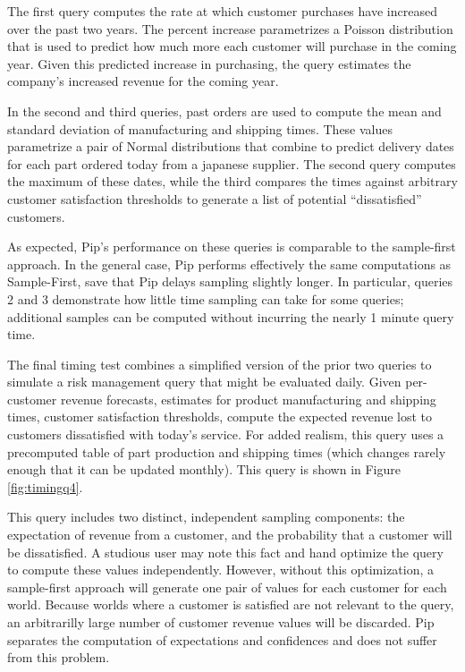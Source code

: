 The first query computes the rate at which customer purchases have increased over the past two years.  The percent increase parametrizes a Poisson distribution that is used to predict how much more each customer will purchase in the coming year.  Given this predicted increase in purchasing, the query estimates the company's increased revenue for the coming year.

In the second and third queries, past orders are used to compute the mean and standard deviation of manufacturing and shipping times.  These values parametrize a pair of Normal distributions that combine to predict delivery dates for each part ordered today from a japanese supplier.  The second query computes the maximum of these dates, while the third compares the times against arbitrary customer satisfaction thresholds to generate a list of potential ``dissatisfied'' customers.

As expected, Pip's performance on these queries is comparable to the sample-first approach.  In the general case, Pip performs effectively the same computations as Sample-First, save that Pip delays sampling slightly longer.  In particular, queries 2 and 3 demonstrate how little time sampling can take for some queries; additional samples can be computed without incurring the nearly 1 minute query time.

The final timing test combines a simplified version of the prior two queries to simulate a risk management query that might be evaluated daily.  Given per-customer revenue forecasts, estimates for product manufacturing and shipping times, customer satisfaction thresholds, compute the expected revenue lost to customers dissatisfied with today's service.  For added realism, this query uses a precomputed table of part production and shipping times (which changes rarely enough that it can be updated monthly).  This query is shown in Figure \ref{fig:timingq4}.

This query includes two distinct, independent sampling components: the expectation of revenue from a customer, and the probability that a customer will be dissatisfied.  A studious user may note this fact and hand optimize the query to compute these values independently.  However, without this optimization, a sample-first approach will generate one pair of values for each customer for each world.  Because worlds where a customer is satisfied are not relevant to the query, an arbitrarilly large number of customer revenue values will be discarded.  Pip separates the computation of expectations and confidences and does not suffer from this problem.  

